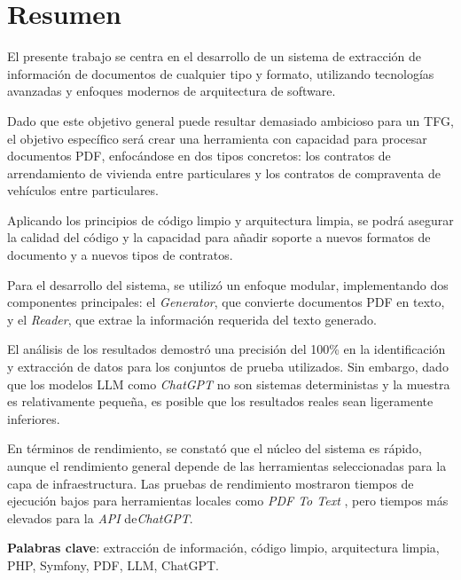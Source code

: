 \newpage
\section*{Resumen}

El presente trabajo se centra en el desarrollo de un sistema de extracción de información de documentos de cualquier
tipo y formato, utilizando tecnologías avanzadas y enfoques modernos de arquitectura de software.

Dado que este objetivo general puede resultar demasiado ambicioso para un TFG, el objetivo específico será crear una
herramienta con capacidad para procesar documentos PDF, enfocándose en dos tipos concretos: los contratos de
arrendamiento de vivienda entre particulares y los contratos de compraventa de vehículos entre particulares.

Aplicando los principios de código limpio y arquitectura limpia, se podrá asegurar la calidad del
código y la capacidad para añadir soporte a nuevos formatos de documento y a nuevos tipos de contratos.

Para el desarrollo del sistema, se utilizó un enfoque modular, implementando dos componentes principales: el
\textit{Generator}, que convierte documentos PDF en texto, y el \textit{Reader}, que extrae la información requerida
del texto generado.

El análisis de los resultados demostró una precisión del 100\% en la identificación y extracción de datos para los
conjuntos de prueba utilizados.
Sin embargo, dado que los modelos LLM como \textit{ChatGPT} no son sistemas deterministas y la muestra es relativamente
pequeña, es posible que los resultados reales sean ligeramente inferiores.

En términos de rendimiento, se constató que el núcleo del sistema es rápido, aunque el rendimiento general depende de
las herramientas seleccionadas para la capa de infraestructura.
Las pruebas de rendimiento mostraron tiempos de ejecución bajos para herramientas locales como \textit{PDF To Text}
, pero
tiempos más elevados para la \textit{API} de\textit{ChatGPT}.


\vspace{1cm}

\textbf{Palabras clave}: extracción de información, código limpio, arquitectura limpia, PHP, Symfony, PDF, LLM, ChatGPT.